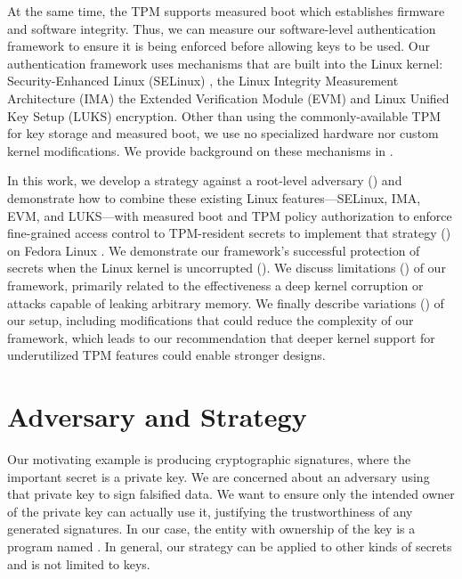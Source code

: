 \documentclass[12pt,letterpaper]{kuthesis}
\begin{document}
At the same time, the TPM supports measured boot which establishes firmware and software integrity.
Thus, we can measure our software-level authentication framework to ensure it is being enforced before allowing keys to be used.
Our authentication framework uses mechanisms that are built into the Linux kernel: Security-Enhanced Linux (SELinux) \cite{Loscocco:2001:SELinux},
the Linux Integrity Measurement Architecture (IMA) \cite{Sailer:2004:Integrity-Measurement-Architecture}
the Extended Verification Module (EVM) \cite{Zohar:EVM:2010} and Linux Unified Key Setup (LUKS) \cite{Fruhwirth:LUKS:2005} encryption.
Other than using the commonly-available TPM for key storage and measured boot,
we use no specialized hardware nor custom kernel modifications.
We provide background on these mechanisms in .

In this work, we develop a strategy against a root-level adversary ()
and demonstrate how to combine these existing Linux features---SELinux, IMA, EVM, and LUKS---with
measured boot and TPM policy authorization to enforce fine-grained access control to TPM-resident secrets
to implement that strategy () on Fedora Linux \cite{FedoraLinux}. 
We demonstrate our framework's successful protection of secrets when the Linux kernel is uncorrupted ().
We discuss limitations () of our framework, primarily related to the effectiveness a deep kernel corruption or attacks capable of leaking arbitrary memory.
We finally describe variations () of our setup, 
including modifications that could reduce the complexity of our framework,
which leads to our recommendation that deeper kernel support for underutilized TPM features could enable stronger designs.

\section{Adversary and Strategy}\label{sec:adversary-strategy}
Our motivating example is producing cryptographic signatures,
where the important secret is a private key.
We are concerned about an adversary using that private key to sign falsified data.
We want to ensure only the intended owner of the private key can actually use it,
justifying the trustworthiness of any generated signatures.
In our case, the entity with ownership of the key is a program named \tpmsign.
In general, our strategy can be applied to other kinds of secrets and is not limited to keys.
\end{document}
